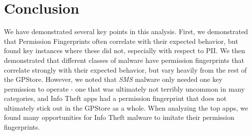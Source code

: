 \section{Conclusion}
We have demonstrated several key points in this analysis. First, we demonstrated that Permission Fingerprints often correlate with their expected behavior, but found key instances where these did not, especially with respect to PII. We then demonstrated that different classes of malware have permission fingerprints that correlate strongly with their expected behavior, but vary heavily from the rest of the GPStore. However, we noted that \textit{SMS} malware only needed one key permission to operate - one that was ultimately not terribly uncommon in many categories, and Info Theft apps had a permission fingerprint that does not ultimately stick out in the GPStore as a whole. When analyzing the top apps, we found many opportunities for Info Theft malware to imitate their permission fingerprints.

